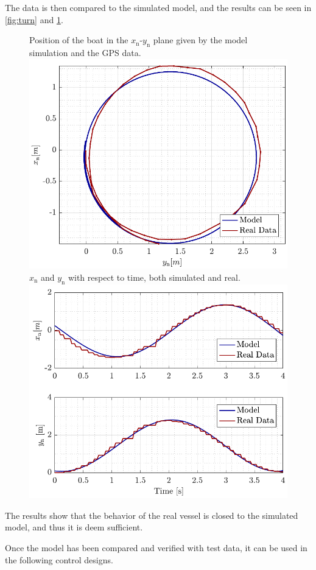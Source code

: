 The data is then compared to the simulated model, and the results can be seen in \autoref{fig:turn} and \ref{fig:turn_time}.

\begin{figure}[H]
    \captionbox 
    {   
        Position of the boat in the $x_\mathrm{n}$-$y_\mathrm{n}$ plane given by the model simulation and the GPS data.
        \label{fig:turn}
    }                                                                 
    {                                                                  
        \includegraphics[width=.45\textwidth]{figures/turn}         
    }                                                                    
    \hspace{5pt}                                                          
    \captionbox  
    {      
        $x_\mathrm{n}$ and $y_\mathrm{n}$ with respect to time, both simulated and real.
        \label{fig:turn_time}
    }                                                                          
    {
        \includegraphics[width=.45\textwidth]{figures/turn_time}
    }
\end{figure}

The results show that the behavior of the real vessel is closed to the simulated model, and thus it is deem sufficient.

Once the model has been compared and verified with test data, it can be used in the following control designs.